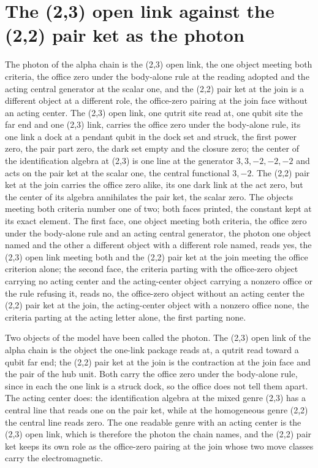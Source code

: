 \section{The (2,3) open link against the (2,2) pair ket as the photon}\label{mod:V-1-D541891-rpho-t1}
\begin{chtheorem}\label{box:V-1-D541891-rpho-t1:1}
The photon of the alpha chain is the (2,3) open link, the one object meeting both criteria, the office zero under the body-alone rule at the reading adopted and the acting central generator at the scalar one, and the (2,2) pair ket at the join is a different object at a different role, the office-zero pairing at the join face without an acting center. The (2,3) open link, one qutrit site read at, one qubit site the far end and one (2,3) link, carries the office zero under the body-alone rule, its one link a dock at a pendant qubit in the dock set and struck, the first power zero, the pair part zero, the dark set empty and the closure zero; the center of the identification algebra at (2,3) is one line at the generator $3,3,-2,-2,-2$ and acts on the pair ket at the scalar one, the central functional $3,-2$. The (2,2) pair ket at the join carries the office zero alike, its one dark link at the act zero, but the center of its algebra annihilates the pair ket, the scalar zero. The objects meeting both criteria number one of two; both faces printed, the constant kept at its exact element.
The first face, one object meeting both criteria, the office zero under the body-alone rule and an acting central generator, the photon one object named and the other a different object with a different role named, reads yes, the (2,3) open link meeting both and the (2,2) pair ket at the join meeting the office criterion alone; the second face, the criteria parting with the office-zero object carrying no acting center and the acting-center object carrying a nonzero office or the rule refusing it, reads no, the office-zero object without an acting center the (2,2) pair ket at the join, the acting-center object with a nonzero office none, the criteria parting at the acting letter alone, the first parting none.
\end{chtheorem}
Two objects of the model have been called the photon. The (2,3) open link of the alpha chain is the object the one-link package reads at, a qutrit read toward a qubit far end; the (2,2) pair ket at the join is the contraction at the join face and the pair of the hub unit. Both carry the office zero under the body-alone rule, since in each the one link is a struck dock, so the office does not tell them apart. The acting center does: the identification algebra at the mixed genre (2,3) has a central line that reads one on the pair ket, while at the homogeneous genre (2,2) the central line reads zero. The one readable genre with an acting center is the (2,3) open link, which is therefore the photon the chain names, and the (2,2) pair ket keeps its own role as the office-zero pairing at the join whose two move classes carry the electromagnetic.
